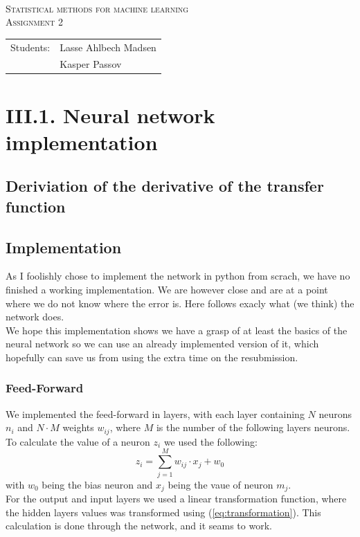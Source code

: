 \documentclass{article}
\begin{document}
\begin{titlepage}
\begin{center}
    \hline \\[0.2cm]
\textsc{\Large Statistical methods for machine learning}\\[0.5cm]
\textsc{\large Assignment 2}\\[0.5cm]
    \hline
    \hline
\vspace{2 cm}
\begin{tabular}{ll}
Students: & Lasse Ahlbech Madsen \\
          & Kasper Passov\\
\end{tabular}
\end{center}
\vspace{5 cm}
\newpage
\end{titlepage}

\section{III.1. Neural network implementation}

\subsection{Deriviation of the derivative of the transfer function}

\newpage

\subsection{Implementation}
As I foolishly chose to implement the network in python from scrach, we have no finished a working implementation. We are however close and are at a point where we do not know where the error is. Here follows exacly what (we think) the network does.\\
We hope this implementation shows we have a grasp of at least the basics of the neural network so we can use an already implemented version of it, which hopefully can save us from using the extra time on the resubmission.

\subsubsection{Feed-Forward}
We implemented the feed-forward in layers, with each layer containing $N$ neurons $n_i$ and $N \cdot M$ weights $w_{ij}$, where $M$ is the number of the following layers neurons.\\
To calculate the value of a neuron $z_i$ we used the following:
\begin{equation}
    z_i = \sum_{j=1}^{M} w_{ij} \cdot x_{j} + w_0
\end{equation}
with $w_0$ being the bias neuron and $x_j$ being the vaue of neuron $m_j$.\\
For the output and input layers we used a linear transformation function, where the hidden layers values was transformed using (\ref{eq:transformation}).
This calculation is done through the network, and it seams to work.
\end{document}
